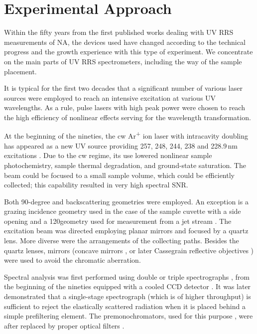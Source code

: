 \section{Experimental Approach}

Within the fifty years from the first published works dealing with UV RRS
measurements of NA, the devices used have changed according to the technical
progress and the growth experience with this type of experiment.
We concentrate on the main parts of UV RRS spectrometers, including the way of
the sample placement.

It is typical for the first two decades that a significant number of various
laser sources were employed to reach an intensive excitation at various UV
wavelengths.
As a rule, pulse lasers with high peak power were chosen to reach the high
efficiency of nonlinear effects serving for the wavelength transformation.

At the beginning of the nineties,
the cw Ar\textsuperscript{+} ion laser with intracavity
doubling has appeared as a new UV source providing 257, 248, 244, 238 and
228.9\,nm excitations
\parencite{%
	Asher1993b,%
	Russell1995%
}.
Due to the cw regime, its use lowered nonlinear sample photochemistry, sample
thermal degradation, and ground-state saturation.
The beam could be focused to a small sample volume, which could be efficiently
collected; this capability resulted in very high spectral SNR.

Both 90-degree and backscattering geometries were employed. An exception is a
grazing incidence geometry used in the case of the sample cuvette with a side
opening
\parencite{Jolles1984}
and a 120\textdegree geometry used for measurement from a jet stream
\parencite{Fodor1985}.
The excitation beam was directed employing planar mirrors and focused by a
quartz lens.
More diverse were the arrangements of the collecting paths.
Besides the quartz lenses, mirrors (concave mirrors
\cite{Blazej1977},
or later Cassegrain reflective objectives
\cite{%
	Toyama1991,%
	Russell1995%
})
were used to avoid the chromatic aberration.

Spectral analysis was first performed using double or triple spectrographs
\parencite{%
	Harada1975,%
	Gfrorer1993a,%
	Toyama1993%
},
from the beginning of the nineties equipped with a cooled CCD detector
\parencite{%
	Gfrorer1993a,%
	Toyama1993%
}.
It was later demonstrated that a single-stage spectrograph (which is of higher
throughput) is sufficient to reject the elastically scattered radiation when it
is placed behind a simple prefiltering element.
The premonochromators, used for this purpose
\parencite{%
	Hashimoto1993,%
	Russell1995%
},
were after replaced by proper optical filters
\parencite{%
	Munro1997,%
	Bykov2013%
}.

